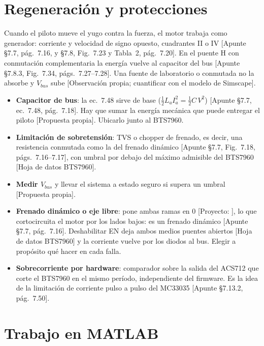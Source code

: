\documentclass[11pt,a4paper]{article}
\newcommand{\code}[1]{\texttt{\detokenize{#1}}}
\newcommand{\fuente}[1]{{\footnotesize\textcolor{black!60}{[#1]}}}
\begin{document}
\section{Regeneración y protecciones}
\label{sec:regeneracion}

Cuando el piloto mueve el yugo contra la fuerza, el motor trabaja como generador: corriente y velocidad de signo opuesto, cuadrantes II o IV \fuente{Apunte §7.7, pág.~7.16, y §7.8, Fig.~7.23 y Tabla~2, pág.~7.20}. En el puente H con conmutación complementaria la energía vuelve al capacitor del bus \fuente{Apunte §7.8.3, Fig.~7.34, págs.~7.27--7.28}. Una fuente de laboratorio o conmutada no la absorbe y $V_{bus}$ sube \fuente{Observación propia; cuantificar con el modelo de Simscape}.
\begin{itemize}
\item \textbf{Capacitor de bus}: la ec.~7.48 sirve de base ($\tfrac12L_aI_a^2=\tfrac12C\,V^2$) \fuente{Apunte §7.7, ec.~7.48, pág.~7.18}. Hay que sumar la energía mecánica que puede entregar el piloto \fuente{Propuesta propia}. Ubicarlo junto al BTS7960.
\item \textbf{Limitación de sobretensión}: TVS o chopper de frenado, es decir, una resistencia conmutada como la del frenado dinámico \fuente{Apunte §7.7, Fig.~7.18, págs.~7.16--7.17}, con umbral por debajo del máximo admisible del BTS7960 \fuente{Hoja de datos BTS7960}.
\item \textbf{Medir $V_{bus}$} y llevar el sistema a estado seguro si supera un umbral \fuente{Propuesta propia}.
\item \textbf{Frenado dinámico o eje libre}: \code{stop()} pone ambas ramas en 0 \fuente{Proyecto: \code{include/MotorDriver.h}}, lo que cortocircuita el motor por los lados bajos: es un frenado dinámico \fuente{Apunte §7.7, pág.~7.16}. Deshabilitar EN deja ambos medios puentes abiertos \fuente{Hoja de datos BTS7960} y la corriente vuelve por los diodos al bus. Elegir a propósito qué hacer en cada falla.
\item \textbf{Sobrecorriente por hardware}: comparador sobre la salida del ACS712 que corte el BTS7960 en el mismo período, independiente del firmware. Es la idea de la limitación de corriente pulso a pulso del MC33035 \fuente{Apunte §7.13.2, pág.~7.50}.
\end{itemize}

\section{Trabajo en MATLAB}
\label{sec:matlab}
\end{document}
